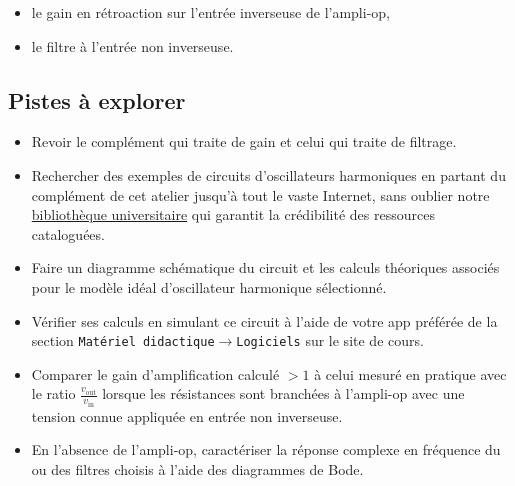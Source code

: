 \documentclass[canadien,12pt,oneside,letterpaper]{article}
\begin{document}
\begin{itemize}
    \item le gain en rétroaction sur l'entrée inverseuse de l'ampli-op,
    \item le filtre à l'entrée non inverseuse.
\end{itemize}

\subsection{Pistes à explorer}
\begin{itemize}
    \item Revoir le complément qui traite de gain et celui qui traite de filtrage.
    \item Rechercher des exemples de circuits d'oscillateurs harmoniques en partant du complément de cet atelier jusqu'à tout le vaste Internet, sans oublier notre \href{https://www.bibl.ulaval.ca}{bibliothèque universitaire} qui garantit la crédibilité des ressources cataloguées.
    \item Faire un diagramme schématique du circuit et les calculs théoriques associés pour le modèle idéal d'oscillateur harmonique sélectionné.
    \item Vérifier ses calculs en simulant ce circuit à l'aide de votre app préférée de la section \texttt{Matériel didactique}$\rightarrow$\texttt{Logiciels} sur le site de cours.
    \item Comparer le gain d'amplification calculé $>1$ à celui mesuré en pratique avec le ratio $\frac{v_{\text{out}}}{v_{\text{in}}}$ lorsque les résistances sont branchées à l'ampli-op avec une tension connue appliquée en entrée non inverseuse.
    \item En l'absence de l'ampli-op, caractériser la réponse complexe en fréquence du ou des filtres choisis à l'aide des diagrammes de Bode.
\end{itemize}


\end{document}
